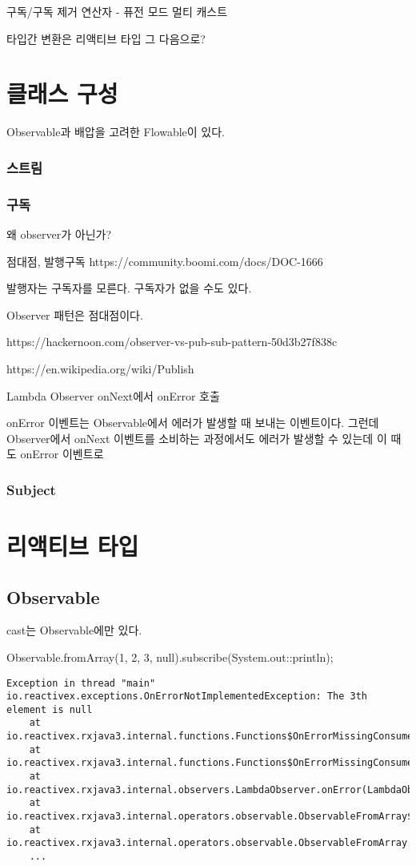 \documentclass{book}
\begin{document}
구독/구독 제거
연산자
- 퓨전 모드
멀티 캐스트

타입간 변환은 리액티브 타입 그 다음으로?

\section{클래스 구성}
Observable과 배압을 고려한 Flowable이 있다.

\subsubsection{스트림}

\subsubsection{구독}
왜 observer가 아닌가?

점대점, 발행구독
https://community.boomi.com/docs/DOC-1666

발행자는 구독자를 모른다. 구독자가 없을 수도 있다.

Observer 패턴은 점대점이다. 

https://hackernoon.com/observer-vs-pub-sub-pattern-50d3b27f838c

https://en.wikipedia.org/wiki/Publish%

Lambda Observer onNext에서 onError 호출

onError 이벤트는 Observable에서 에러가 발생할 때 보내는 이벤트이다. 그런데 Observer에서 onNext 이벤트를 소비하는 과정에서도 에러가 발생할 수 있는데 이 때도 onError 이벤트로 


\subsubsection{Subject}

\section{리액티브 타입}
\subsection{Observable}
cast는 Observable에만 있다.


Observable.fromArray(1, 2, 3, null).subscribe(System.out::println);
\begin{verbatim}
Exception in thread "main" io.reactivex.exceptions.OnErrorNotImplementedException: The 3th element is null
	at io.reactivex.rxjava3.internal.functions.Functions$OnErrorMissingConsumer.accept(Functions.java:704)
	at io.reactivex.rxjava3.internal.functions.Functions$OnErrorMissingConsumer.accept(Functions.java:701)
	at io.reactivex.rxjava3.internal.observers.LambdaObserver.onError(LambdaObserver.java:74)
	at io.reactivex.rxjava3.internal.operators.observable.ObservableFromArray$FromArrayDisposable.run(ObservableFromArray.java:104)
	at io.reactivex.rxjava3.internal.operators.observable.ObservableFromArray.subscribeActual(ObservableFromArray.java:36)
	...
\end{verbatim}
\end{document}
